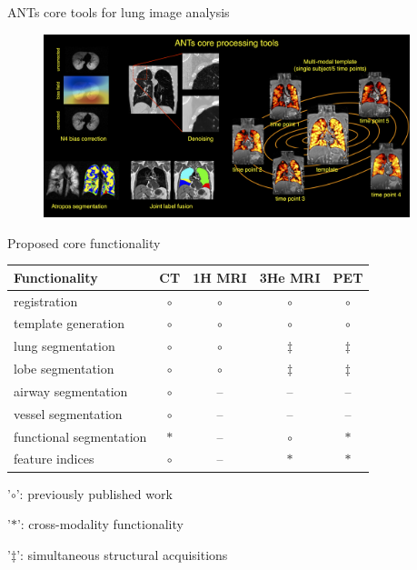 \documentclass[ignorenonframetext,]{beamer}
\begin{document}
\begin{frame}{ANTs core tools for lung image analysis}

\centering

\begin{figure}
\includegraphics[width=0.95\textwidth]{./lung/figures/coreANtsToolsLung.png}
\end{figure}

\end{frame}

\begin{frame}{Proposed core functionality}

\begin{longtable}[c]{@{}lcccc@{}}
\toprule
\textbf{Functionality} & \textbf{CT} & \textbf{1H MRI} & \textbf{3He
MRI} & \textbf{PET}\tabularnewline
\midrule
\endhead
registration & \(\circ\) & \(\circ\) & \(\circ\) &
\(\circ\)\tabularnewline
template generation & \(\circ\) & \(\circ\) & \(\circ\) &
\(\circ\)\tabularnewline
lung segmentation & \(\circ\) & \(\circ\) & \(\ddagger\) &
\(\ddagger\)\tabularnewline
lobe segmentation & \(\circ\) & \(\circ\) & \(\ddagger\) &
\(\ddagger\)\tabularnewline
airway segmentation & \(\circ\) & -- & -- & --\tabularnewline
vessel segmentation & \(\circ\) & -- & -- & --\tabularnewline
functional segmentation & \(\ast\) & -- & \(\circ\) &
\(\ast\)\tabularnewline
feature indices & \(\circ\) & -- & \(\ast\) & \(\ast\)\tabularnewline
\bottomrule
\end{longtable}

\footnotesize

'\(\circ\)': previously published work

'\(\ast\)': cross-modality functionality

'\(\ddagger\)': simultaneous structural acquisitions

\end{frame}
\end{document}
